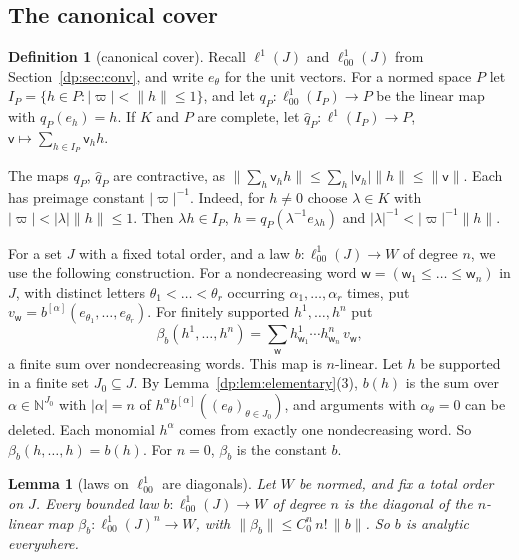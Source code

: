 \documentclass[11pt]{amsart}
\newtheorem{lemma}[theorem]{Lemma}
\theoremstyle{definition}
\newtheorem{definition}[theorem]{Definition}
\theoremstyle{remark}
\numberwithin{equation}{section}
\newcommand{\N}{\mathbb N}
\newcommand{\abs}[1]{\lvert #1\rvert}
\newcommand{\norm}[1]{\lVert #1\rVert}
\theoremstyle{plain}
\theoremstyle{definition}
\theoremstyle{plain}
\begin{document}
\subsection{The canonical cover}\label{dp:ssec:cover}

\begin{definition}[canonical cover]\label{dp:def:cover}
Recall $\ell^1(J)$ and $\ell^1_{00}(J)$ from Section~\ref{dp:sec:conv}, and write $e_\theta$ for the unit vectors. For a normed space $P$ let $I_P=\{h\in P:\abs\varpi<\norm h\le1\}$, and let $q_P\colon\ell^1_{00}(I_P)\to P$ be the linear map with $q_P(e_h)=h$. If $K$ and $P$ are complete, let $\hat q_P\colon\ell^1(I_P)\to P$, $\mathsf v\mapsto\sum_{h\in I_P}\mathsf v_hh$.
\end{definition}

The maps $q_P$, $\hat q_P$ are contractive, as $\norm{\sum_h\mathsf v_hh}\le\sum_h\abs{\mathsf v_h}\norm h\le\norm{\mathsf v}$. Each has preimage constant $\abs\varpi^{-1}$. Indeed, for $h\ne0$ choose $\lambda\in K$ with $\abs\varpi<\abs\lambda\norm h\le1$. Then $\lambda h\in I_P$, $h=q_P(\lambda^{-1}e_{\lambda h})$ and $\abs\lambda^{-1}<\abs\varpi^{-1}\norm h$.

For a set $J$ with a fixed total order, and a law $b\colon\ell^1_{00}(J)\to W$ of degree $n$, we use the following construction. For a nondecreasing word $\mathsf w=(\mathsf w_1\le\dots\le\mathsf w_n)$ in $J$, with distinct letters $\theta_1<\dots<\theta_r$ occurring $\alpha_1,\dots,\alpha_r$ times, put $v_{\mathsf w}=b^{[\alpha]}(e_{\theta_1},\dots,e_{\theta_r})$. For finitely supported $h^1,\dots,h^n$ put
\begin{equation}\label{dp:eq:word-lift}
 \beta_b(h^1,\dots,h^n)=\sum_{\mathsf w}h^1_{\mathsf w_1}\cdots h^n_{\mathsf w_n}\,v_{\mathsf w},
\end{equation}
a finite sum over nondecreasing words. This map is $n$-linear. Let $h$ be supported in a finite set $J_0\subseteq J$. By Lemma~\ref{dp:lem:elementary}(3), $b(h)$ is the sum over $\alpha\in\N^{J_0}$ with $\abs\alpha=n$ of $h^\alpha b^{[\alpha]}((e_\theta)_{\theta\in J_0})$, and arguments with $\alpha_\theta=0$ can be deleted. Each monomial $h^\alpha$ comes from exactly one nondecreasing word. So $\beta_b(h,\dots,h)=b(h)$. For $n=0$, $\beta_b$ is the constant $b$.

\begin{lemma}[laws on $\ell^1_{00}$ are diagonals]\label{dp:lem:laws-cover}
Let $W$ be normed, and fix a total order on $J$. Every bounded law $b\colon\ell^1_{00}(J)\to W$ of degree $n$ is the diagonal of the $n$-linear map $\beta_b\colon\ell^1_{00}(J)^n\to W$, with $\norm{\beta_b}\le C_0^n\,n!\,\norm b$. So $b$ is analytic everywhere.
\end{lemma}
\end{document}
